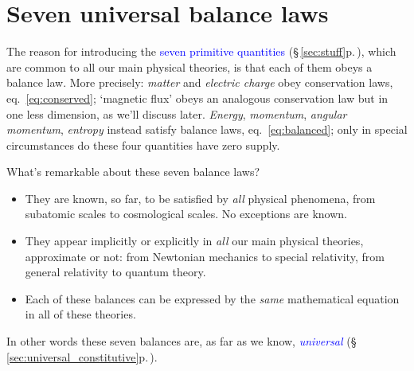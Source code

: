 \documentclass[a4paper,12pt,%
onecolumn,oneside,%
british%
]{memoir}
\renewcommand*{\|}[1][]{\nonscript\:#1\vert\nonscript\:\mathopen{}}
\newcommand*{\sect}{\S}%
\newcommand*{\eqn}{eq.}%
\renewcommand*{\autoref}[3][\sect\,\ref]{\textcolor{blue}{#3} {\color{blue}\scriptsize(\faIcon[regular]{eye}\;#1{#2}\;p.\,\pageref{#2})}}
\begin{document}
\section{Seven universal balance laws}
\label{sec:seven_universal}

The reason for introducing the \autoref{sec:stuff}{seven primitive quantities}, which are common to all our main physical theories, is that each of them obeys a balance law. More precisely: \emph{matter} and \emph{electric charge} obey conservation laws, \eqn~\eqref{eq:conserved}; \enquote*{magnetic flux} obeys an analogous conservation law but in one less dimension, as we'll discuss later.  \emph{Energy}, \emph{momentum}, \emph{angular momentum}, \emph{entropy} instead satisfy balance laws, \eqn~\eqref{eq:balanced}; only in special circumstances do these four quantities have zero supply.

What's remarkable about these seven balance laws?
\begin{itemize}[para]
\item They are known, so far, to be satisfied by \emph{all} physical phenomena, from subatomic scales to cosmological scales. No exceptions are known.
\item They appear implicitly or explicitly in \emph{all} our main physical theories, approximate or not: from Newtonian mechanics to special relativity, from general relativity to quantum theory.
\item Each of these balances can be expressed by the \emph{same} mathematical equation in all of these theories.
\end{itemize}
In other words these seven balances are, as far as we know, \autoref{sec:universal_constitutive}{\emph{universal}}.
\end{document}

